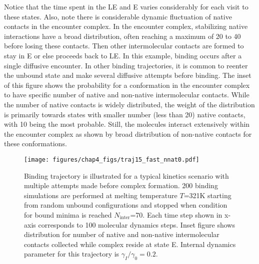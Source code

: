 \documentclass[../talant.diss.submit.tex]{subfiles}
\begin{document}
Notice that the time spent in the LE and E varies considerably for each visit to these
states. Also, note there is considerable dynamic fluctuation of native
contacts in the encounter complex. In the encounter complex,
stabilizing native interactions %
have a broad distribution,
often reaching a maximum of 20 to 40 before losing these contacts. Then other intermolecular
contacts are formed to stay in E or else proceeds back to LE.
In this example, binding occurs after a single diffusive encounter.
In other binding trajectories, it is common to reenter the unbound state and
make several diffusive attempts before binding.
The inset of this figure shows the probability for a conformation in the encounter complex
to have specific number of native and non-native intermolecular contacts. While the number of native contacts is widely distributed, the weight of the distribution
is primarily towards states with smaller number (less than 20) native contacts, with 10 being
the most probable. Still, the molecules interact extensively within the encounter complex
as shown by broad distribution of non-native contacts for these conformations. 

 
\begin{figure}[htp!]
  \begin{centering}                                                                                        
    \texttt{[image: figures/chap4\_figs/traj15\_fast\_nnat0.pdf]}
    \caption{Binding trajectory is illustrated for a typical kinetics scenario with multiple
      attempts made before complex formation. 200 binding simulations are performed at
      melting temperature $T$=321K starting from random unbound configurations and stopped
      when condition for bound minima is reached $N_{\mathrm{inter}}$=70. Each time step shown
      in x-axis corresponds to 100 molecular dynamics steps. Inset figure shows distribution
      for number of native and non-native intermolecular contacts collected while complex reside
      at state E. Internal dynamics parameter for this trajectory is $\gamma_{I}/\gamma_0 = 0.2$.  }
\label{fig:traj15_fast_nnat0}                                                                                 
  \end{centering}  
\end{figure}
\end{document}
